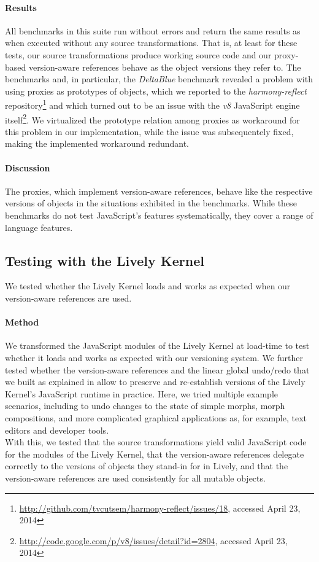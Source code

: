 \paragraph{Results}
All benchmarks in this suite run without errors and return the same results as when executed without any source transformations.
That is, at least for these tests, our source transformations produce working source code and our proxy-based version-aware references behave as the object versions they refer to.
The benchmarks and, in particular, the \emph{DeltaBlue} benchmark revealed a problem with using proxies as prototypes of objects, which we reported to the \emph{harmony-reflect} repository\footnote{\url{http://github.com/tvcutsem/harmony-reflect/issues/18}, accessed April 23, 2014} and which turned out to be an issue with the \emph{v8} JavaScript engine itself\footnote{\url{http://code.google.com/p/v8/issues/detail?id=2804}, accessed April 23, 2014}.
We virtualized the prototype relation among proxies as workaround for this problem in our implementation, while the issue was subsequentely fixed, making the implemented workaround redundant.

\paragraph{Discussion}
The proxies, which implement version-aware references, behave like the respective versions of objects in the situations exhibited in the benchmarks.
While these benchmarks do not test JavaScript's features systematically, they cover a range of language features.


\subsection{Testing with the Lively Kernel}

We tested whether the Lively Kernel loads and works as expected when our version-aware references are used.

\paragraph{Method}
We transformed the JavaScript modules of the Lively Kernel at load-time to test whether it loads and works as expected with our versioning system.
We further tested whether the version-aware references and the linear global undo/redo that we built as explained in  allow to preserve and re-establish versions of the Lively Kernel's JavaScript runtime in practice.
Here, we tried multiple example scenarios, including to undo changes to the state of simple morphs, morph compositions, and more complicated graphical applications as, for example, text editors and developer tools.\\
With this, we tested that the source transformations yield valid JavaScript code for the modules of the Lively Kernel, that the version-aware references delegate correctly to the versions of objects they stand-in for in Lively, and that the version-aware references are used consistently for all mutable objects.


